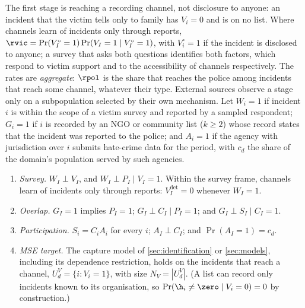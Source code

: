 The first stage is reaching a recording channel, not disclosure to anyone: an incident that the victim tells only to family has $V_i=0$ and is on no list. Where channels learn of incidents only through reports, $\rvic=\Pr(V^{\circ}_I=1)\Pr(V_I=1\mid V^{\circ}_I=1)$, with $V^{\circ}_i=1$ if the incident is disclosed to anyone; a survey that asks both questions identifies both factors, which respond to victim support and to the accessibility of channels respectively. The rates are \emph{aggregate}: $\rpol$ is the share that reaches the police among incidents that reach some channel, whatever their type. External sources observe a stage only on a subpopulation selected by their own mechanism. Let $W_i=1$ if incident $i$ is within the scope of a victim survey and reported by a sampled respondent; $G_i=1$ if $i$ is recorded by an NGO or community list ($k\ge2$) whose record states that the incident was reported to the police; and $A_i=1$ if the agency with jurisdiction over $i$ submits hate-crime data for the period, with $c_d$ the share of the domain's population served by such agencies.

\begin{assumption}\label{asm:funnel}
\leavevmode
\begin{enumerate}[({F}1)]
  \item\label{asm:funnel-survey} \emph{Survey.} $W_I\perp V_I$, and $W_I\perp P_I\mid V_I=1$. Within the survey frame, channels learn of incidents only through reports: $V^{\mathrm{det}}_I=0$ whenever $W_I=1$.
  \item\label{asm:funnel-overlap} \emph{Overlap.} $G_I=1$ implies $P_I=1$; $G_I\perp C_I\mid P_I=1$; and $G_I\perp S_I\mid C_I=1$.
  \item\label{asm:funnel-part} \emph{Participation.} $S_i=C_iA_i$ for every $i$; $A_I\perp C_I$; and $\Pr(A_I=1)=c_d$.
  \item\label{asm:funnel-mse} \emph{MSE target.} The capture model of \cref{sec:identification} or \cref{sec:models}, including its dependence restriction, holds on the incidents that reach a channel, $U_d^{V}=\{i:V_i=1\}$, with size $N_V=|U_d^{V}|$. (A list can record only incidents known to its organisation, so $\Pr(\h_i\neq\zero\mid V_i=0)=0$ by construction.)
\end{enumerate}
\end{assumption}

